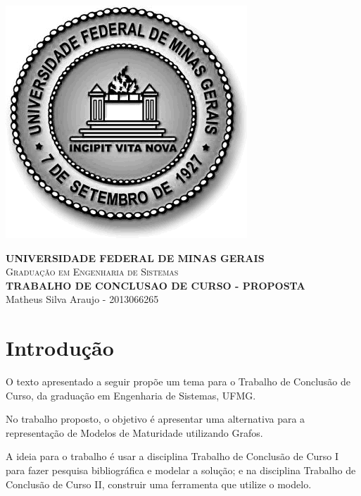 \documentclass[10pt,a4paper]{article}
\begin{document}

	\begin{minipage}[b]{0.05\linewidth}
			\includegraphics[scale=0.3]{ufmg}
	\end{minipage}
	\hfill
	\begin{minipage}[b]{0.95\linewidth}
		\begin{flushright}
			\textbf{UNIVERSIDADE FEDERAL DE MINAS GERAIS} \\
			\textsc{Graduação em Engenharia de Sistemas} \\
			\textbf{TRABALHO DE CONCLUSAO DE CURSO - PROPOSTA} \\
			Matheus Silva Araujo - 2013066265
		\end{flushright}
	\end{minipage}

	\begin{center}
		\hrulefill
	\end{center}

	
	\section{Introdução}
	
	O texto apresentado a seguir propõe um tema para o Trabalho de Conclusão de Curso, da graduação em Engenharia de Sistemas, UFMG.
	
	No trabalho proposto, o objetivo é apresentar uma alternativa para a representação de Modelos de Maturidade utilizando Grafos.
	
	A ideia para o trabalho é usar a disciplina Trabalho de Conclusão de Curso I para fazer pesquisa bibliográfica e modelar a solução; e na disciplina Trabalho de Conclusão de Curso II, construir uma ferramenta que utilize o modelo.
	
\end{document}
